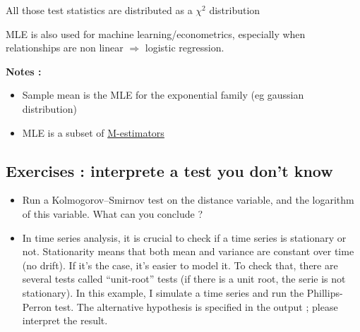 \documentclass[
]{book}
\newenvironment{Shaded}{\begin{snugshade}}{\end{snugshade}}
\newcommand{\CommentTok}[1]{\textcolor[rgb]{0.56,0.35,0.01}{\textit{#1}}}
\newcommand{\DataTypeTok}[1]{\textcolor[rgb]{0.13,0.29,0.53}{#1}}
\newcommand{\DecValTok}[1]{\textcolor[rgb]{0.00,0.00,0.81}{#1}}
\newcommand{\KeywordTok}[1]{\textcolor[rgb]{0.13,0.29,0.53}{\textbf{#1}}}
\newcommand{\NormalTok}[1]{#1}
\newcommand{\OperatorTok}[1]{\textcolor[rgb]{0.81,0.36,0.00}{\textbf{#1}}}
\newcommand{\StringTok}[1]{\textcolor[rgb]{0.31,0.60,0.02}{#1}}
\providecommand{\tightlist}{%
  \setlength{\itemsep}{0pt}\setlength{\parskip}{0pt}}
\begin{document}
All those test statistics are distributed as a \(\chi^2\) distribution

MLE is also used for machine learning/econometrics, especially when relationships are non linear \(\Rightarrow\) logistic regression.

\textbf{Notes :}

\begin{itemize}
\tightlist
\item
  Sample mean is the MLE for the exponential family (eg gaussian distribution)
\item
  MLE is a subset of \href{https://en.wikipedia.org/wiki/M-estimator}{M-estimators}
\end{itemize}

\hypertarget{exercises-interprete-a-test-you-dont-know}{%
\subsection{Exercises : interprete a test you don't know}\label{exercises-interprete-a-test-you-dont-know}}

\begin{itemize}
\tightlist
\item
  Run a Kolmogorov--Smirnov test on the distance variable, and the logarithm of this variable. What can you conclude ?
\item
  In time series analysis, it is crucial to check if a time series is stationary or not. Stationarity means that both mean and variance are constant over time (no drift). If it's the case, it's easier to model it.
  To check that, there are several tests called ``unit-root'' tests (if there is a unit root, the serie is not stationary).
  In this example, I simulate a time series and run the Phillips-Perron test. The alternative hypothesis is specified in the output ; please interpret the result.
\end{itemize}

\begin{Shaded}
\end{Shaded}
\end{document}

